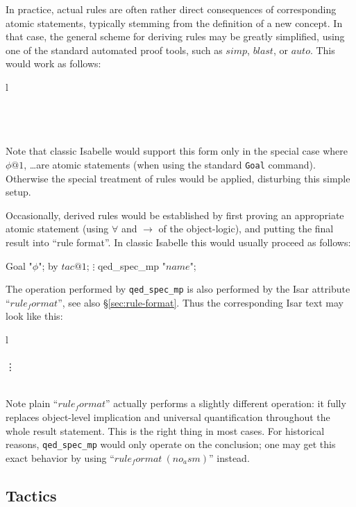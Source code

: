 \medskip In practice, actual rules are often rather direct consequences of
corresponding atomic statements, typically stemming from the definition of a
new concept.  In that case, the general scheme for deriving rules may be
greatly simplified, using one of the standard automated proof tools, such as
$simp$, $blast$, or $auto$.  This would work as follows:
\begin{matharray}{l}
   \\
  \quad {} \quad {} \\
  \quad {} \\
  \quad \DONE \\
\end{matharray}
Note that classic Isabelle would support this form only in the special case
where $\phi@1$, \dots are atomic statements (when using the standard
\texttt{Goal} command).  Otherwise the special treatment of rules would be
applied, disturbing this simple setup.

\medskip Occasionally, derived rules would be established by first proving an
appropriate atomic statement (using $\forall$ and $\longrightarrow$ of the
object-logic), and putting the final result into ``rule format''.  In classic
Isabelle this would usually proceed as follows:
\begin{ttbox}
 Goal "\(\phi\)";
 by \(tac@1\);
   \(\vdots\)
 qed_spec_mp "\(name\)";
\end{ttbox}
The operation performed by \texttt{qed_spec_mp} is also performed by the Isar
attribute ``$rule_format$'', see also \S\ref{sec:rule-format}.  Thus the
corresponding Isar text may look like this:
\begin{matharray}{l}
   \\
  \quad {} \\
  \qquad \vdots \\
  \quad \DONE \\
\end{matharray}
Note plain ``$rule_format$'' actually performs a slightly different operation:
it fully replaces object-level implication and universal quantification
throughout the whole result statement.  This is the right thing in most cases.
For historical reasons, \texttt{qed_spec_mp} would only operate on the
conclusion; one may get this exact behavior by using
``$rule_format~(no_asm)$'' instead.

\subsection{Tactics}\label{sec:conv-tac}

